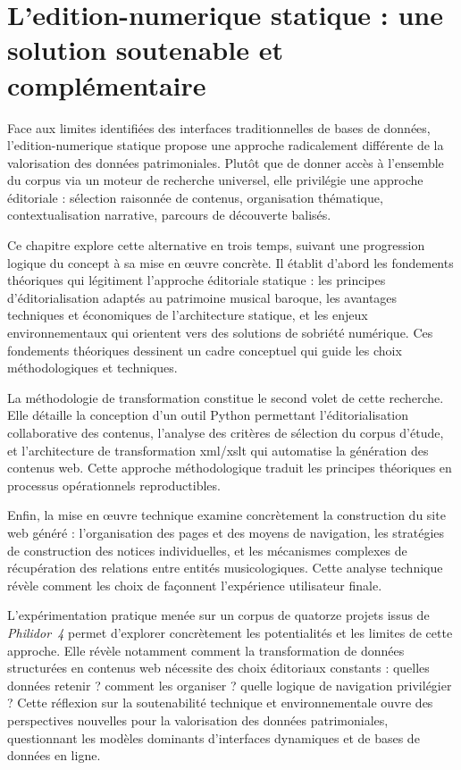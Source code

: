 \chapter[L'\gls{edition-numerique} statique]{L'\gls{edition-numerique} statique : une solution soutenable et complémentaire}

Face aux limites identifiées des interfaces traditionnelles de bases de données, l'\gls{edition-numerique} statique propose une approche radicalement différente de la valorisation des données patrimoniales. Plutôt que de donner accès à l'ensemble du corpus via un moteur de recherche universel, elle privilégie une approche éditoriale : sélection raisonnée de contenus, organisation thématique, contextualisation narrative, parcours de découverte balisés.

Ce chapitre explore cette alternative en trois temps, suivant une progression logique du concept à sa mise en œuvre concrète. Il établit d'abord les fondements théoriques qui légitiment l'approche éditoriale statique : les principes d'éditorialisation adaptés au patrimoine musical baroque, les avantages techniques et économiques de l'architecture statique, et les enjeux environnementaux qui orientent vers des solutions de sobriété numérique. Ces fondements théoriques dessinent un cadre conceptuel qui guide les choix méthodologiques et techniques.

La méthodologie de transformation constitue le second volet de cette recherche. Elle détaille la conception d'un outil Python permettant l'éditorialisation collaborative des contenus, l'analyse des critères de sélection du corpus d'étude, et l'architecture de transformation \gls{xml}/\gls{xslt} qui automatise la génération des contenus web. Cette approche méthodologique traduit les principes théoriques en processus opérationnels reproductibles.

Enfin, la mise en œuvre technique examine concrètement la construction du site web généré : l'organisation des pages et des moyens de navigation, les stratégies de construction des notices individuelles, et les mécanismes complexes de récupération des relations entre entités musicologiques. Cette analyse technique révèle comment les choix de   façonnent l'expérience utilisateur finale.

L'expérimentation pratique menée sur un corpus de quatorze projets issus de \textit{Philidor~4} permet d'explorer concrètement les potentialités et les limites de cette approche. Elle révèle notamment comment la transformation de données structurées en contenus web nécessite des choix éditoriaux constants : quelles données retenir ? comment les organiser ? quelle logique de navigation privilégier ? Cette réflexion sur la soutenabilité technique et environnementale ouvre des perspectives nouvelles pour la valorisation des données patrimoniales, questionnant les modèles dominants d'interfaces dynamiques et de bases de données en ligne.

